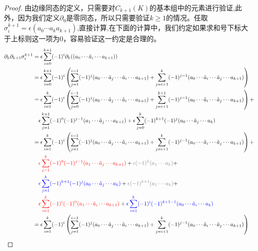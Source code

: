 \begin{proof}
由边缘同态的定义，只需要对$C_{k+1}(K)$的基本组中的元素进行验证,此外，因为我们定义$\partial_{0}$是零同态，所以只需要验证$k\geq 1$的情况。任取$\sigma^{k+1}_{i}=\epsilon(a_{0}\cdots a_{k}a_{k+1})$,直接计算,在下面的计算中，我们约定如果求和号下标大于上标则这一项为0，容易验证这一约定是合理的。
\begin{equation*}
\begin{aligned}
    \partial_{k}\partial_{k+1}\sigma^{k+1}_{i}&=\epsilon\sum\limits_{i=0}^{k+1}(-1)^{i}\partial_{k}((a_{0}\cdots \hat{a}_{i}\cdots a_{k+1}))\\
    &=\epsilon\sum\limits_{i=0}^{k+1}(-1)^{i}\left(\sum\limits_{j=1}^{i-1}(-1)^{j}(a_{0}\cdots\hat{a}_{j}\cdots \hat{a}_{i}\cdots a_{k+1})+\sum\limits_{j=i+1}^{k}(-1)^{j-1}(a_{0}\cdots\hat{a}_{i}\cdots \hat{a}_{j}\cdots a_{k+1})\right)\\
    &=\epsilon\sum\limits_{i=1}^{k}(-1)^{i}\left(\sum\limits_{j=0}^{i-1}(-1)^{j}(a_{0}\cdots\hat{a}_{j}\cdots \hat{a}_{i}\cdots a_{k+1})+\sum\limits_{j=i+1}^{k+1}(-1)^{j-1}(a_{0}\cdots\hat{a}_{i}\cdots \hat{a}_{j}\cdots a_{k+1})\right)+\\&\quad\epsilon\sum\limits_{j=1}^{k+1}(-1)^{0}(-1)^{j-1}(a_{1}\cdots \hat{a}_{j}\cdots a_{k+1})+\epsilon\sum\limits_{j=0}^{k}(-1)^{k+1}(-1)^{j}(a_{0}\cdots \hat{a}_{j}\cdots a_{k})\\
    &=\epsilon\sum\limits_{i=1}^{k}(-1)^{i}\left(\sum\limits_{j=1}^{i-1}(-1)^{j}(a_{0}\cdots\hat{a}_{j}\cdots \hat{a}_{i}\cdots a_{k+1})+\sum\limits_{j=i+1}^{k}(-1)^{j-1}(a_{0}\cdots\hat{a}_{i}\cdots \hat{a}_{j}\cdots a_{k+1})\right)+
    \\&\quad\textcolor{red}{\epsilon\sum\limits_{j=1}^{k}(-1)^{0}(-1)^{j-1}(a_{1}\cdots \hat{a}_{j}\cdots a_{k+1})}+\textcolor{gray}{\epsilon(-1)^{k}(a_{1}\cdots a_{k})}+
    \\&\quad\textcolor{blue}{\epsilon\sum\limits_{j=1}^{k}(-1)^{k+1}(-1)^{j}(a_{0}\cdots \hat{a}_{j}\cdots a_{k})}+\textcolor{gray}{\epsilon(-1)^{k+1}(a_{1}\cdots a_{k})}+
    \\&\quad\textcolor{red}{\epsilon\sum\limits_{i=1}^{k}(-1)^{i}(-1)^{0}(a_{1}\cdots \hat{a}_{i}\cdots a_{k+1})}+\textcolor{blue}{\epsilon\sum\limits_{i=1}^{k}(-1)^{i}(-1)^{k+1-1}(a_{0}\cdots \hat{a}_{i}\cdots a_{k})}\\
    &=\epsilon\sum\limits_{i=1}^{k}(-1)^{i}\left(\sum\limits_{j=1}^{i-1}(-1)^{j}(a_{0}\cdots\hat{a}_{j}\cdots \hat{a}_{i}\cdots a_{k+1})+\sum\limits_{j=i+1}^{k}(-1)^{j-1}(a_{0}\cdots\hat{a}_{i}\cdots \hat{a}_{j}\cdots a_{k+1})\right)

\end{aligned}
\end{equation*}
\end{proof}
